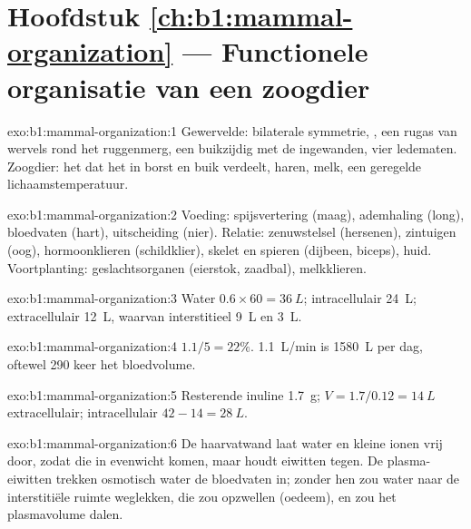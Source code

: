 \section*{Hoofdstuk \ref{ch:b1:mammal-organization} --- Functionele organisatie van een zoogdier}

\begin{solution}{exo:b1:mammal-organization:1}
Gewervelde: bilaterale symmetrie, , een rugas van wervels rond het
ruggenmerg, een buikzijdig  met de ingewanden, vier ledematen.
Zoogdier: het  dat het  in borst en buik verdeelt, haren, melk,
een geregelde lichaamstemperatuur.
\end{solution}

\begin{solution}{exo:b1:mammal-organization:2}
Voeding: spijsvertering (maag), ademhaling (long), bloedvaten (hart),
uitscheiding (nier). Relatie: zenuwstelsel (hersenen), zintuigen (oog),
hormoonklieren (schildklier), skelet en spieren (dijbeen, biceps), huid.
Voortplanting: geslachtsorganen (eierstok, zaadbal), melkklieren.
\end{solution}

\begin{solution}{exo:b1:mammal-organization:3}
Water $0.6\times 60 = \qty{36}{L}$; intracellulair \qty{24}{L};
extracellulair \qty{12}{L}, waarvan interstitieel \qty{9}{L} en 
\qty{3}{L}.
\end{solution}

\begin{solution}{exo:b1:mammal-organization:4}
$1.1/5 = 22\%$. \qty{1.1}{L/min} is \qty{1580}{L} per dag, oftewel 290 keer
het bloedvolume.
\end{solution}

\begin{solution}{exo:b1:mammal-organization:5}
Resterende inuline \qty{1.7}{g}; $V = 1.7/0.12 = \qty{14}{L}$
extracellulair; intracellulair $42 - 14 = \qty{28}{L}$.
\end{solution}

\begin{solution}{exo:b1:mammal-organization:6}
De haarvatwand laat water en kleine ionen vrij door, zodat die in evenwicht
komen, maar houdt eiwitten tegen. De plasma-eiwitten trekken osmotisch water de
bloedvaten in; zonder hen zou water naar de interstitiële ruimte weglekken, die zou
opzwellen (oedeem), en zou het plasmavolume dalen.
\end{solution}

